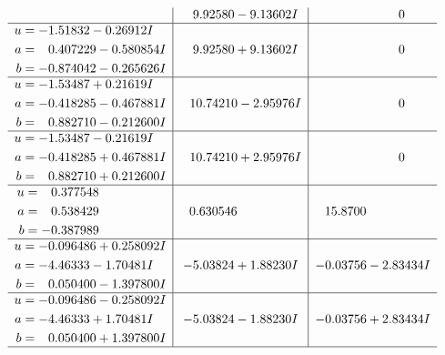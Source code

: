 \documentclass[1p]{elsarticle_modified}
\theoremstyle{definition}
\begin{document}
$$\begin{array}{c|c|c}
 & \phantom{-}9.92580 - 9.13602 I & \phantom{-0.000000 } 0 \\ \hline\begin{aligned}
u &= -1.51832 - 0.26912 I \\
a &= \phantom{-}0.407229 - 0.580854 I \\
b &= -0.874042 - 0.265626 I\end{aligned}
 & \phantom{-}9.92580 + 9.13602 I & \phantom{-0.000000 } 0 \\ \hline\begin{aligned}
u &= -1.53487 + 0.21619 I \\
a &= -0.418285 - 0.467881 I \\
b &= \phantom{-}0.882710 - 0.212600 I\end{aligned}
 & \phantom{-}10.74210 - 2.95976 I & \phantom{-0.000000 } 0 \\ \hline\begin{aligned}
u &= -1.53487 - 0.21619 I \\
a &= -0.418285 + 0.467881 I \\
b &= \phantom{-}0.882710 + 0.212600 I\end{aligned}
 & \phantom{-}10.74210 + 2.95976 I & \phantom{-0.000000 } 0 \\ \hline\begin{aligned}
u &= \phantom{-}0.377548\phantom{ +0.000000I} \\
a &= \phantom{-}0.538429\phantom{ +0.000000I} \\
b &= -0.387989\phantom{ +0.000000I}\end{aligned}
 & \phantom{-}0.630546\phantom{ +0.000000I} & \phantom{-}15.8700\phantom{ +0.000000I} \\ \hline\begin{aligned}
u &= -0.096486 + 0.258092 I \\
a &= -4.46333 - 1.70481 I \\
b &= \phantom{-}0.050400 - 1.397800 I\end{aligned}
 & -5.03824 + 1.88230 I & -0.03756 - 2.83434 I \\ \hline\begin{aligned}
u &= -0.096486 - 0.258092 I \\
a &= -4.46333 + 1.70481 I \\
b &= \phantom{-}0.050400 + 1.397800 I\end{aligned}
 & -5.03824 - 1.88230 I & -0.03756 + 2.83434 I\\
 \hline 
 \end{array}$$\newpage\newpage\renewcommand{\arraystretch}{1}
\end{document}
